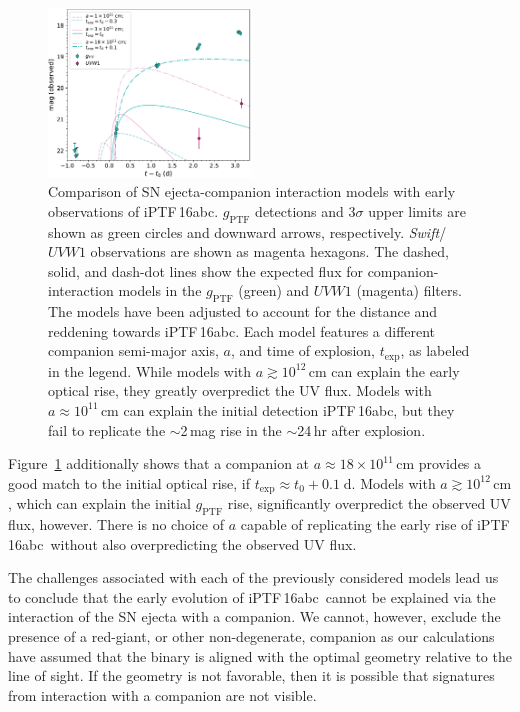\documentclass[twocolumn]{aastex61}
\newcommand{\abc}{iPTF\,16abc}
\begin{document}
\begin{figure}[!thb]
  \centering
  \includegraphics[width=0.48\textwidth]{companion_lc.pdf}
  \caption{Comparison of SN ejecta-companion interaction models 
  with early observations of \abc. $g_\mathrm{PTF}$ 
  detections and 3$\sigma$ upper limits are shown 
  as green circles and downward arrows, respectively. 
  \textit{Swift}/$UVW1$ observations are shown as magenta hexagons.
  The dashed, solid, and dash-dot lines show the expected flux 
  for companion-interaction models in the $g_\mathrm{PTF}$ (green) 
  and $UVW1$ (magenta) filters. The models have been adjusted to 
  account for the distance and reddening towards \abc. Each 
  model features a different companion semi-major axis, $a$, and 
  time of explosion, $t_\mathrm{exp}$, as labeled in the 
  legend. While models with $a \gtrsim 10^{12} \, \mathrm{cm}$ can 
  explain the early optical rise, they greatly 
  overpredict the UV flux. Models with $a \approx 10^{11} \, 
  \mathrm{cm}$ can explain the initial detection \abc, but they 
  fail to replicate the $\sim$2\,mag rise in the $\sim$24\,hr 
  after explosion.
  }
  \label{fig:SN-companion}
\end{figure}

Figure~\ref{fig:SN-companion} additionally shows that a companion at $a \approx 18 \times 10^{11} \, \mathrm{cm}$ provides a good match to the initial optical rise, if $t_\mathrm{exp} \approx t_0 + 0.1 \; \mathrm{d}$. Models with $a \gtrsim 10^{12} \, \mathrm{cm}$, which can explain the initial $g_\mathrm{PTF}$ rise, significantly overpredict the observed UV flux, however. There is no choice of $a$ capable of replicating the early rise of \abc\ without also overpredicting the observed UV flux.

The challenges associated with each of the previously considered models lead us to conclude that the early evolution of \abc\ cannot be explained via the interaction of the SN ejecta with a companion. We cannot, however, exclude the presence of a red-giant, or other non-degenerate, companion as our calculations have assumed that the binary is aligned with the optimal geometry relative to the line of sight. If the geometry is not favorable, then it is possible that signatures from interaction with a companion are not visible. 
\end{document}
